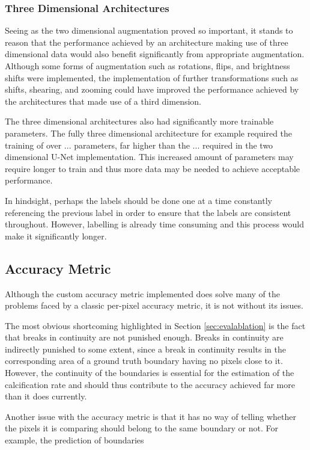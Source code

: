 \subsubsection{Three Dimensional Architectures}

Seeing as the two dimensional augmentation proved so important, it stands to reason that the performance achieved by an architecture making use of three dimensional data would also benefit significantly from appropriate augmentation. Although some forms of augmentation such as rotations, flips, and brightness shifts were implemented, the implementation of further transformations such as shifts, shearing, and zooming could have improved the performance achieved by the architectures that made use of a third dimension.

The three dimensional architectures also had significantly more trainable parameters. The fully three dimensional architecture for example required the training of over ... parameters, far higher than the ... required in the two dimensional U-Net implementation. This increased amount of parameters may require longer to train and thus more data may be needed to achieve acceptable performance.

In hindsight, perhaps the labels should be done one at a time constantly referencing the previous label in order to ensure that the labels are consistent throughout. However, labelling is already time consuming and this process would make it significantly longer.

\subsection{Accuracy Metric}
\label{sec:evalaccuracy}

Although the custom accuracy metric implemented does solve many of the problems faced by a classic per-pixel accuracy metric, it is not without its issues.

The most obvious shortcoming highlighted in Section \ref{sec:evalablation} is the fact that breaks in continuity are not punished enough. Breaks in continuity are indirectly punished to some extent, since a break in continuity results in the corresponding area of a ground truth boundary having no pixels close to it. However, the continuity of the boundaries is essential for the estimation of the calcification rate and should thus contribute to the accuracy achieved far more than it does currently.

Another issue with the accuracy metric is that it has no way of telling whether the pixels it is comparing should belong to the same boundary or not. For example, the prediction of boundaries

